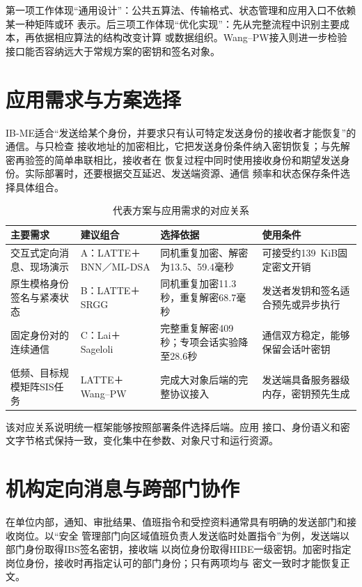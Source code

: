 第一项工作体现“通用设计”：公共五算法、传输格式、状态管理和应用入口不依赖某一种矩阵或环
表示。后三项工作体现“优化实现”：先从完整流程中识别主要成本，再依据相应算法的结构改变计算
或数据组织。Wang--PW接入则进一步检验接口能否容纳远大于常规方案的密钥和签名对象。

\section{应用需求与方案选择}

IB-ME适合“发送给某个身份，并要求只有认可特定发送身份的接收者才能恢复”的通信。与只检查
接收地址的加密相比，它把发送身份条件纳入密钥恢复；与先解密再验签的简单串联相比，接收者在
恢复过程中同时使用接收身份和期望发送身份。实际部署时，还要根据交互延迟、发送端资源、通信
频率和状态保存条件选择具体组合。

\begin{table}[H]
\centering\small
\caption{代表方案与应用需求的对应关系}
\label{tab:application-choice}
\begin{tabularx}{\textwidth}{@{}>{\raggedright\arraybackslash}p{}>{\raggedright\arraybackslash}p{}>{\raggedright\arraybackslash}p{}>{\raggedright\arraybackslash}X@{}}
\toprule
\rowcolor{black!8} 主要需求 & 建议组合 & 选择依据 & 使用条件 \\
\midrule
交互式定向消息、现场演示 & A：LATTE＋BNN／ML-DSA & 同机重复加密、解密为13.5、59.4毫秒 & 可接受约139~KiB固定密文开销 \\
原生模格身份签名与紧凑状态 & B：LATTE＋SRGG & 同机重复加密11.3秒，重复解密68.7毫秒 & 发送者发钥和签名适合预先或异步执行 \\
固定身份对的连续通信 & C：Lai＋Sageloli & 完整重复解密409秒；专项会话实验降至28.6秒 & 通信双方稳定，能够保留会话叶密钥 \\
低频、目标规模矩阵SIS任务 & LATTE＋Wang--PW & 完成大对象后端的完整协议接入 & 发送端具备服务器级内存，密钥预先生成 \\
\bottomrule
\end{tabularx}
\end{table}

该对应关系说明统一框架能够按照部署条件选择后端。应用
接口、身份语义和密文字节格式保持一致，变化集中在参数、对象尺寸和运行资源。

\section{机构定向消息与跨部门协作}

在单位内部，通知、审批结果、值班指令和受控资料通常具有明确的发送部门和接收岗位。以“安全
管理部门向区域值班负责人发送临时处置指令”为例，发送端以部门身份取得IBS签名密钥，接收端
以岗位身份取得HIBE一级密钥。加密时指定岗位身份，接收时再指定认可的部门身份；只有两项均与
密文一致时才能恢复正文。

